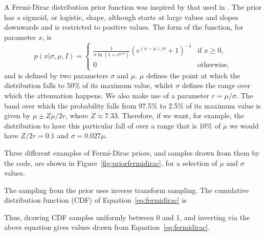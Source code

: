 A Fermi-Dirac distribution prior function was inspired by that used in \citet{Middleton_2015}. The prior has a sigmoid, or logistic,
shape, although starts at large values and slopes downwards and is restricted to positive values. The form of the function, for
parameter $x$, is
\begin{equation}\label{eq:fermidirac}
 p(x|\sigma, \mu, I) = \begin{cases}\frac{1}{\sigma\ln{\left(1+e^{\mu/\sigma} \right)}}\left(e^{(x-\mu)/\sigma} + 1\right)^{-1} & \text{if } x \geqslant 0, \\
                        0 & \text{otherwise},
                       \end{cases}
\end{equation}
and is defined by two parameters $\sigma$ and $\mu$. $\mu$ defines the point at which the distribution falls to 50\% of
its maximum value, whilst $\sigma$ defines the range over which the attenuation happens. We also make use of a parameter
$r = \mu/\sigma$. The band over which the probability falls from 97.5\% to 2.5\% of its maximum value is given by $\mu \pm Z\mu/2r$, where
$Z\approx7.33$. Therefore, if we want, for example, the distribution to have this particular fall of over a range that is 10\% of $\mu$
we would have $Z/2r = 0.1$ and $\sigma = 0.027\mu$.

Three different examples of Fermi-Dirac priors, and samples drawn from them by the code, are shown in Figure~\ref{fig:priorfermidirac},
for a selection of $\mu$ and $\sigma$ values.

The sampling from the prior uses inverse transform sampling. The cumulative distribution function (CDF) of Equation~\ref{eq:fermidirac}
is
Thus, drawing CDF samples uniformly between 0 and 1, and inverting via the above equation gives values drawn from Equation~\ref{eq:fermidirac}.

